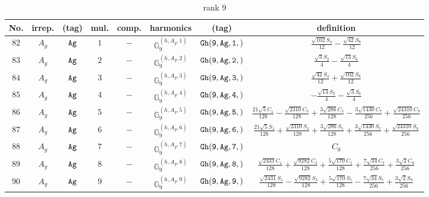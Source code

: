 \documentclass[fleqn,8pt]{jsarticle}
\begin{document}
\begin{table}[ht!]
\begin{center}
\caption{rank 9}
\renewcommand{\arraystretch}{1.3}
\begin{tabular}{cccccccc} \hline \hline
No. & irrep. & (tag) & mul. & comp. & harmonics & (tag) & definition \\ \hline
$ 82 $ & $ A_{g} $ & $ {\tt Ag} $ & $ 1 $ & $ - $ & $ \mathbb{G}_{9}^{(h,A_{g},1)} $ & $ {\tt Gh(9,Ag,1,)} $ & $ \frac{\sqrt{102} S_{4}}{12} - \frac{\sqrt{42} S_{8}}{12} $ \\
$ 83 $ & $ A_{g} $ & $ {\tt Ag} $ & $ 2 $ & $ - $ & $ \mathbb{G}_{9}^{(h,A_{g},2)} $ & $ {\tt Gh(9,Ag,2,)} $ & $ \frac{\sqrt{3} S_{2}}{4} - \frac{\sqrt{13} S_{6}}{4} $ \\
$ 84 $ & $ A_{g} $ & $ {\tt Ag} $ & $ 3 $ & $ - $ & $ \mathbb{G}_{9}^{(h,A_{g},3)} $ & $ {\tt Gh(9,Ag,3,)} $ & $ \frac{\sqrt{42} S_{4}}{12} + \frac{\sqrt{102} S_{8}}{12} $ \\
$ 85 $ & $ A_{g} $ & $ {\tt Ag} $ & $ 4 $ & $ - $ & $ \mathbb{G}_{9}^{(h,A_{g},4)} $ & $ {\tt Gh(9,Ag,4,)} $ & $ - \frac{\sqrt{13} S_{2}}{4} - \frac{\sqrt{3} S_{6}}{4} $ \\
$ 86 $ & $ A_{g} $ & $ {\tt Ag} $ & $ 5 $ & $ - $ & $ \mathbb{G}_{9}^{(h,A_{g},5)} $ & $ {\tt Gh(9,Ag,5,)} $ & $ \frac{21 \sqrt{5} C_{1}}{128} - \frac{\sqrt{2310} C_{3}}{128} + \frac{3 \sqrt{286} C_{5}}{128} - \frac{3 \sqrt{1430} C_{7}}{256} + \frac{\sqrt{24310} C_{9}}{256} $ \\
$ 87 $ & $ A_{g} $ & $ {\tt Ag} $ & $ 6 $ & $ - $ & $ \mathbb{G}_{9}^{(h,A_{g},6)} $ & $ {\tt Gh(9,Ag,6,)} $ & $ \frac{21 \sqrt{5} S_{1}}{128} + \frac{\sqrt{2310} S_{3}}{128} + \frac{3 \sqrt{286} S_{5}}{128} + \frac{3 \sqrt{1430} S_{7}}{256} + \frac{\sqrt{24310} S_{9}}{256} $ \\
$ 88 $ & $ A_{g} $ & $ {\tt Ag} $ & $ 7 $ & $ - $ & $ \mathbb{G}_{9}^{(h,A_{g},7)} $ & $ {\tt Gh(9,Ag,7,)} $ & $ C_{0} $ \\
$ 89 $ & $ A_{g} $ & $ {\tt Ag} $ & $ 8 $ & $ - $ & $ \mathbb{G}_{9}^{(h,A_{g},8)} $ & $ {\tt Gh(9,Ag,8,)} $ & $ \frac{\sqrt{2431} C_{1}}{128} + \frac{\sqrt{9282} C_{3}}{128} + \frac{5 \sqrt{170} C_{5}}{128} + \frac{7 \sqrt{34} C_{7}}{256} + \frac{3 \sqrt{2} C_{9}}{256} $ \\
$ 90 $ & $ A_{g} $ & $ {\tt Ag} $ & $ 9 $ & $ - $ & $ \mathbb{G}_{9}^{(h,A_{g},9)} $ & $ {\tt Gh(9,Ag,9,)} $ & $ \frac{\sqrt{2431} S_{1}}{128} - \frac{\sqrt{9282} S_{3}}{128} + \frac{5 \sqrt{170} S_{5}}{128} - \frac{7 \sqrt{34} S_{7}}{256} + \frac{3 \sqrt{2} S_{9}}{256} $ \\

\end{tabular}
\end{center}
\end{table}
\end{document}
